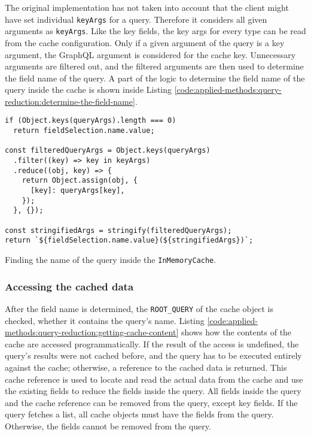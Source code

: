 \bigskip

\noindent The original implementation has not taken into account that the client might have set individual \texttt{keyArgs} for a query. Therefore it considers all given arguments as \texttt{keyArgs}. Like the key fields, the key args for every type can be read from the cache configuration. Only if a given argument of the query is a key argument, the GraphQL argument is considered for the cache key. Unnecessary arguments are filtered out, and the filtered arguments are then used to determine the field name of the query. A part of the logic to determine the field name of the query inside the cache is shown inside Listing \ref{code:applied-methods:query-reduction:determine-the-field-name}.

\ifshowListings
\begin{listing}[H]
\begin{verbatim}
if (Object.keys(queryArgs).length === 0)
  return fieldSelection.name.value;

const filteredQueryArgs = Object.keys(queryArgs)
  .filter((key) => key in keyArgs)
  .reduce((obj, key) => {
    return Object.assign(obj, {
      [key]: queryArgs[key],
    });
  }, {});

const stringifiedArgs = stringify(filteredQueryArgs);
return `${fieldSelection.name.value}(${stringifiedArgs})`;
\end{verbatim}
\caption{Finding the name of the query inside the \texttt{InMemoryCache}.}\label{code:applied-methods:query-reduction:determine-the-field-name}
\end{listing}
\fi

\subsubsection{Accessing the cached data}

\noindent After the field name is determined, the \texttt{ROOT\_QUERY} of the cache object is checked, whether it contains the query's name. Listing \ref{code:applied-methods:query-reduction:getting-cache-content} shows how the contents of the cache are accessed programmatically. If the result of the access is undefined, the query's results were not cached before, and the query has to be executed entirely against the cache; otherwise, a reference to the cached data is returned. This cache reference is used to locate and read the actual data from the cache and use the existing fields to reduce the fields inside the query. All fields inside the query and the cache reference can be removed from the query, except key fields. If the query fetches a list, all cache objects must have the fields from the query. Otherwise, the fields cannot be removed from the query.

